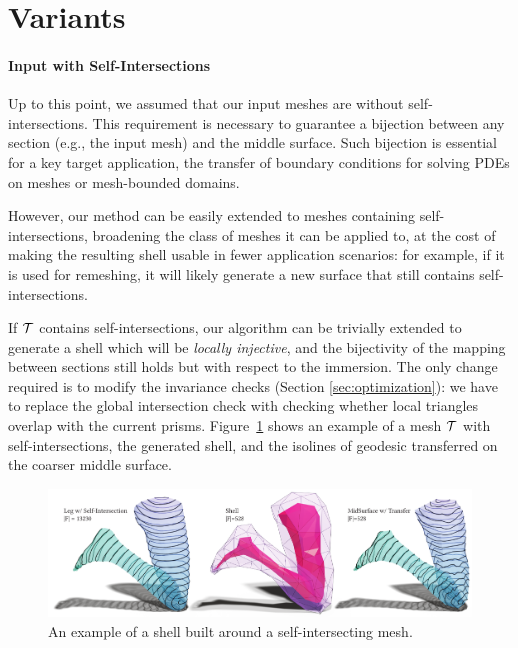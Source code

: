 


\section{Variants}\label{sec:variants}


\paragraph{Input with Self-Intersections}
Up to this point, we assumed that our input meshes are without self-intersections. This requirement is necessary to guarantee a bijection between any section (e.g., the input mesh) and the middle surface. Such bijection is essential for a key target application, the transfer of boundary conditions for solving PDEs on meshes or mesh-bounded domains. 

However, our method can be easily extended to meshes containing self-intersections, broadening the class of meshes it can be applied to, at the cost of making the resulting shell usable in fewer application scenarios: for example, if it is used for remeshing, it will likely generate a new surface that still contains self-intersections.

If $\mathcal{T}$ contains self-intersections, our algorithm can be trivially extended to generate a shell which will be \emph{locally injective}, and the bijectivity of the mapping between sections still holds but with respect to the immersion. The only change required is to modify the invariance checks (Section \ref{sec:optimization}): we have to replace the global intersection check with checking whether local triangles overlap with the current prisms. Figure~\ref{prism:fig:intersect-leg} shows an example of a mesh $\mathcal{T}$ with self-intersections, the generated shell, and the isolines of geodesic transferred on the coarser middle surface.
\begin{figure}
    \centering
    \includegraphics[width=\linewidth]{prism-tex/figs/leg-intersect}
    \caption{An example of a shell built around a self-intersecting mesh.}
    \label{prism:fig:intersect-leg}
    
\end{figure}


